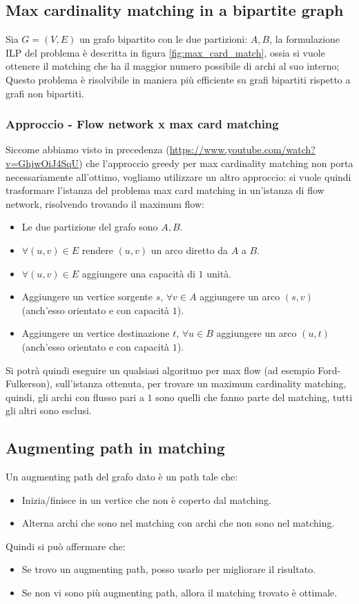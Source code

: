 \documentclass[12pt,a4paper]{article}
\begin{document}
\subsection{Max cardinality matching in a bipartite graph}
Sia $G = (V, E)$ un grafo bipartito con le due partizioni: $A, B$, la formulazione ILP del problema è descritta in figura \ref{fig:max_card_match}, ossia si vuole ottenere il matching che ha il maggior numero possibile di archi al suo interno; Questo problema è risolvibile in maniera più efficiente su grafi bipartiti rispetto a grafi non bipartiti.

\subsubsection{Approccio - Flow network x max card matching}
Siccome abbiamo visto in precedenza (\url{https://www.youtube.com/watch?v=GhjwOiJ4SqU}) che l'approccio greedy per max cardinality matching non porta necessariamente all'ottimo, vogliamo utilizzare un altro approccio: si vuole quindi trasformare l'istanza del problema max card matching in un'istanza di flow network, risolvendo trovando il maximum flow:
\begin{itemize}
\item Le due partizione del grafo sono $A, B$.
\item $\forall (u, v) \in E$ rendere $(u, v)$ un arco diretto da $A$ a $B$.
\item $\forall (u, v) \in E$ aggiungere una capacità di $1$ unità.
\item Aggiungere un vertice sorgente $s$, $\forall v \in A$ aggiungere un arco $(s, v)$ (anch'esso orientato e con capacità $1$).
\item Aggiungere un vertice destinazione $t$, $\forall u \in B$ aggiungere un arco $(u, t)$ (anch'esso orientato e con capacità $1$).
\end{itemize}
Si potrà quindi eseguire un qualsiasi algoritmo per max flow (ad esempio Ford-Fulkerson), sull'istanza ottenuta, per trovare un maximum cardinality matching, quindi, gli archi con flusso pari a $1$ sono quelli che fanno parte del matching, tutti gli altri sono esclusi.

\subsection{Augmenting path in matching}
Un augmenting path del grafo dato è un path tale che:
\begin{itemize}
\item Inizia/finisce in un vertice che non è coperto dal matching.
\item Alterna archi che sono nel matching con archi che non sono nel matching.
\end{itemize}
Quindi si può affermare che:
\begin{itemize}
\item Se trovo un augmenting path, posso usarlo per migliorare il risultato.
\item Se non vi sono più augmenting path, allora il matching trovato è ottimale.
\end{itemize}
\end{document}
